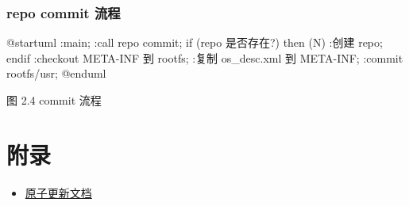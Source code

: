 \documentclass{utart}
\begin{document}
\subsubsection{repo commit 流程}
\begin{center}
  \begin{adjustbox}{scale=1.0}
    \begin{plantuml}
      @startuml
      :main;
      :call repo commit;
      if (repo 是否存在?) then (N)
      :创建 repo;
      endif
      :checkout META-INF 到 rootfs;
      :复制 os_desc.xml 到 META-INF;
      :commit rootfs/usr;
      @enduml
    \end{plantuml}
  \end{adjustbox}

  图 2.4 commit 流程
\end{center}

\section{附录}
\begin{itemize}[leftmargin=4em]
\item \href{https://gitlabwh.uniontech.com/wuhan/v23/atomic/uos-upgrade-manager/-/tree/master/docs}{原子更新文档}
\end{itemize}
\end{document}
